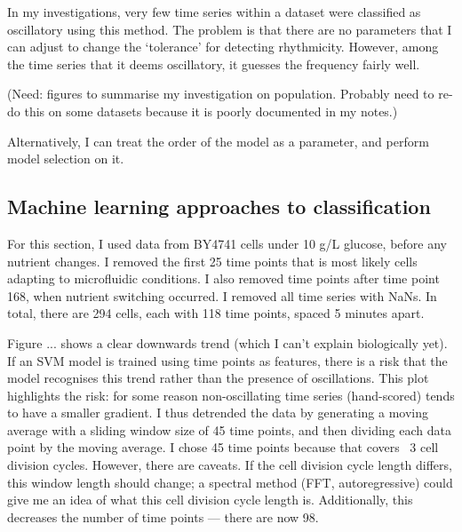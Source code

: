 In my investigations, very few time series within a dataset were classified as oscillatory using this method.
The problem is that there are no parameters that I can adjust to change the `tolerance' for detecting rhythmicity.
However, among the time series that it deems oscillatory, it guesses the frequency fairly well.

(Need: figures to summarise my investigation on population.  Probably need to re-do this on some datasets because it is poorly documented in my notes.)

Alternatively, I can treat the order of the model as a parameter, and perform model selection on it.

\subsection{Machine learning approaches to classification}
\label{subsec:analysis-classification-ml}




For this section, I used data from BY4741 cells under 10 g/L glucose, before any nutrient changes.
I removed the first 25 time points that is most likely cells adapting to microfluidic conditions.
I also removed time points after time point 168, when nutrient switching occurred.
I removed all time series with NaNs.
In total, there are 294 cells, each with 118 time points, spaced 5 minutes apart.



Figure ... shows a clear downwards trend (which I can't explain biologically yet). If an SVM model is trained using time points as features, there is a risk that the model recognises this trend rather than the presence of oscillations.
This plot highlights the risk: for some reason non-oscillating time series (hand-scored) tends to have a smaller gradient.
I thus detrended the data by generating a moving average with a sliding window size of 45 time points, and then dividing each data point by the moving average. I chose 45 time points because that covers ~3 cell division cycles.
However, there are caveats.
If the cell division cycle length differs, this window length should change; a spectral method (FFT, autoregressive) could give me an idea of what this cell division cycle length is.
Additionally, this decreases the number of time points --- there are now 98.

